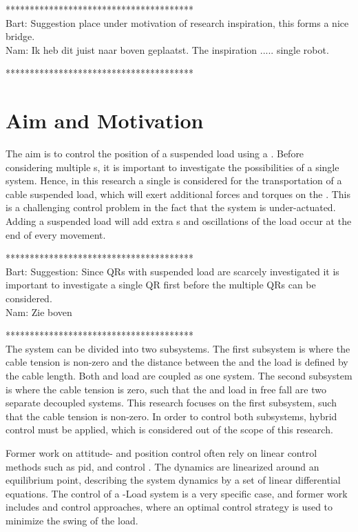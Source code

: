 ***************************************\\
Bart: Suggestion place under motivation of research inspiration, this forms a nice bridge.\\
Nam: Ik heb dit juist naar boven geplaatst. The inspiration ..... single robot. 

***************************************\\
\newpage
\section{Aim and Motivation}\label{sec:int.motivation}
The aim is to control the position of a suspended load using a . Before considering multiple s, it is important to investigate the possibilities of a single  system. Hence, in this research a single  is considered for the transportation of a cable suspended load, which will exert additional forces and torques on the . This is a challenging control problem in the fact that the  system is under-actuated. Adding a suspended load will add extra s and oscillations of the load occur at the end of every movement. 

***************************************\\
Bart: Suggestion: Since QRs with suspended load are scarcely investigated it is important to investigate a single QR first before the multiple QRs can be considered.\\
Nam: Zie boven

***************************************\\
The system can be divided into two subsystems. The first subsystem is where the cable tension is non-zero and the distance between the  and the load is defined by the cable length. Both  and load are coupled as one system. The second subsystem is where the cable tension is zero, such that the  and load in free fall are two separate decoupled systems. This research focuses on the first subsystem, such that the cable tension is non-zero. In order to control both subsystems, hybrid control must be applied, which is considered out of the scope of this research.

Former work on  attitude- and position control often rely on linear control methods such as \acs{pid}\cite{bibid},  \cite{Bangura2014} and  control \cite{bibid}. The dynamics are linearized around an equilibrium point, describing the system dynamics by a set of linear differential equations. 
The control of a -Load system is a very specific case, and former work includes  \cite{PraveenThesis} and \cite{bibid} control approaches, where an optimal control strategy is used to minimize the swing of the load. 

